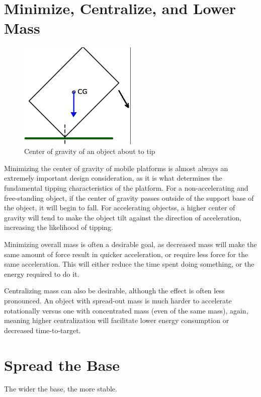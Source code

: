 \section{Minimize, Centralize, and Lower Mass}

\begin{figure}
	\includegraphics[width=0.5\textwidth]{imgs/cg_explanation.png}
	\caption{Center of gravity of an object about to tip}
\end{figure}

Minimizing the center of gravity of mobile platforms is almost always an extremely important design consideration, as it is what determines the fundamental tipping characteristics of the platform. For a non-accelerating and free-standing object, if the center of gravity passes outside of the support base of the object, it will begin to fall. For accelerating objectss, a higher center of gravity will tend to make the object tilt against the direction of acceleration, increasing the likelihood of tipping.

Minimizing overall mass is often a desirable goal, as decreased mass will make the same amount of force result in quicker acceleration, or require less force for the same acceleration. This will either reduce the time spent doing something, or the energy required to do it.

Centralizing mass can also be desirable, although the effect is often less pronounced. An object with spread-out mass is much harder to accelerate rotationally versus one with concentrated mass (even of the same mass), again, meaning higher centralization will facilitate lower energy consumption or decreased time-to-target.

\section{Spread the Base}

\begin{theorem} \label{theorem:spread_base}
The wider the base, the more stable.
\end{theorem}

